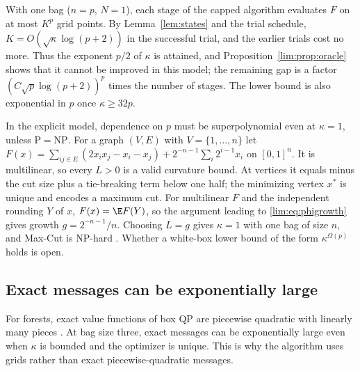 \begin{remark}
\label{lim:rem:oracle}
With one bag ($n=p$, $N=1$), each stage of the capped algorithm evaluates
$F$ on at most $K^p$ grid points. By Lemma~\ref{lem:states} and the
trial schedule, $K=O(\sqrt\kappa\log(p+2))$ in the successful trial, and
the earlier trials cost no more. Thus the exponent $p/2$ of $\kappa$ is
attained, and Proposition~\ref{lim:prop:oracle} shows that it cannot be
improved in this model; the remaining gap is a factor
$(C\sqrt p\log(p+2))^p$ times the number of stages. The lower bound is also
exponential in $p$ once $\kappa\ge32p$.

In the explicit model, dependence on $p$ must be superpolynomial even at
$\kappa=1$, unless $\mathrm P=\mathrm{NP}$. For a graph $(V,E)$ with
$V=\{1,\ldots,n\}$ let
$F(x)=\sum_{ij\in E}(2x_ix_j-x_i-x_j)+2^{-n-1}\sum_i2^{i-1}x_i$ on
$[0,1]^n$. It is multilinear, so every $L>0$ is a valid curvature bound.
At vertices it equals minus the cut size plus a tie-breaking term below
one half; the minimizing vertex $x^*$ is unique and encodes a maximum cut.
For multilinear $F$ and the independent rounding $Y$ of $x$,
$F(x)=\E F(Y)$, so the argument leading to \eqref{lim:eq:phigrowth} gives
growth $g=2^{-n-1}/n$. Choosing $L=g$ gives $\kappa=1$ with one bag of size
$n$, and Max-Cut is NP-hard \cite{GareyJohnson1979}. Whether a white-box
lower bound of the form $\kappa^{\Omega(p)}$ holds is open.
\end{remark}

\subsection{Exact messages can be exponentially large}
\label{sec:limits-messages}

For forests, exact value functions of box QP are piecewise quadratic with
linearly many pieces \cite{DelPiaKhajavirad2026}. At bag size three, exact
messages can be exponentially large even when $\kappa$ is bounded and the
optimizer is unique. This is why the algorithm uses grids rather than exact
piecewise-quadratic messages.

